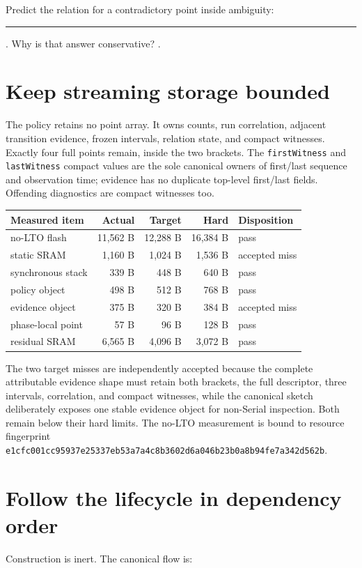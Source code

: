 \documentclass[10pt]{article}
\newcommand{\longblank}{\rule{1.5in}{0.4pt}}
\begin{document}
Predict the relation for a contradictory point inside ambiguity:
\longblank. Why is that answer conservative? \hrulefill.

\section{Keep streaming storage bounded}
The policy retains no point array. It owns counts, run correlation, adjacent
transition evidence, frozen intervals, relation state, and compact witnesses.
Exactly four full points remain, inside the two brackets. The
\texttt{firstWitness} and \texttt{lastWitness} compact values are the sole
canonical owners of first/last sequence and observation time; evidence has no
duplicate top-level first/last fields. Offending diagnostics are compact
witnesses too.

\begin{tabularx}{\linewidth}{@{}l r r r X@{}}
\toprule
Measured item & Actual & Target & Hard & Disposition\\
\midrule
no-LTO flash & 11,562 B & 12,288 B & 16,384 B & pass\\
static SRAM & 1,160 B & 1,024 B & 1,536 B & accepted miss\\
synchronous stack & 339 B & 448 B & 640 B & pass\\
policy object & 498 B & 512 B & 768 B & pass\\
evidence object & 375 B & 320 B & 384 B & accepted miss\\
phase-local point & 57 B & 96 B & 128 B & pass\\
residual SRAM & 6,565 B & 4,096 B & 3,072 B & pass\\
\bottomrule
\end{tabularx}

The two target misses are independently accepted because the complete
attributable evidence shape must retain both brackets, the full descriptor,
three intervals, correlation, and compact witnesses, while the canonical
sketch deliberately exposes one stable evidence object for non-Serial
inspection. Both remain below their hard limits. The no-LTO measurement is
bound to resource fingerprint
\texttt{e1cfc001cc95937e25337eb53a7a4c8b3602d6a046b23b0a8b94fe7a342d562b}.

\newpage
\section{Follow the lifecycle in dependency order}
Construction is inert. The canonical flow is:
\end{document}

